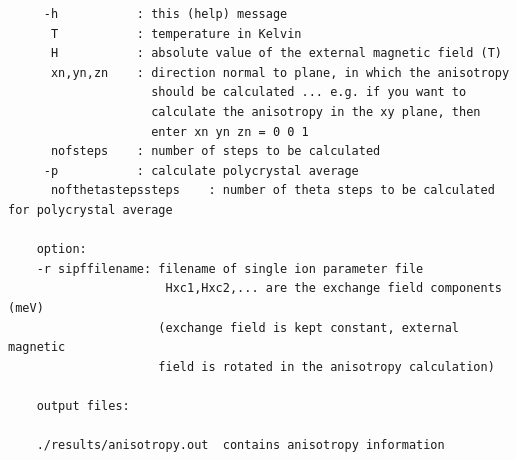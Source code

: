 \begin{description}
\begin{verbatim}
     -h           : this (help) message
      T           : temperature in Kelvin
      H           : absolute value of the external magnetic field (T)
      xn,yn,zn    : direction normal to plane, in which the anisotropy
                    should be calculated ... e.g. if you want to
                    calculate the anisotropy in the xy plane, then
                    enter xn yn zn = 0 0 1
      nofsteps    : number of steps to be calculated 
     -p           : calculate polycrystal average
      nofthetastepssteps    : number of theta steps to be calculated for polycrystal average

    option:
    -r sipffilename: filename of single ion parameter file
                      Hxc1,Hxc2,... are the exchange field components (meV)
                     (exchange field is kept constant, external magnetic
                     field is rotated in the anisotropy calculation)

    output files:

    ./results/anisotropy.out  contains anisotropy information


\end{verbatim}
\end{description}

